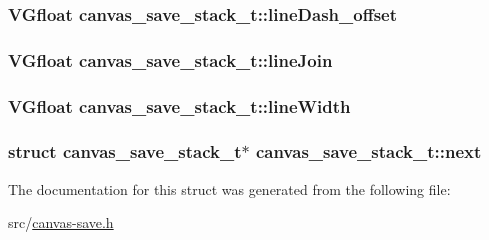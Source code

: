 \subsubsection[{line\+Dash\+\_\+offset}]{\setlength{\rightskip}{0pt plus 5cm}V\+Gfloat canvas\+\_\+save\+\_\+stack\+\_\+t\+::line\+Dash\+\_\+offset}\label{structcanvas__save__stack__t_a2a77bb2fd9162791d2913b8ebaaaf75b}
\hypertarget{structcanvas__save__stack__t_a5d8ef969283a63b2d7f8d2e42da4196b}{}
\subsubsection[{line\+Join}]{\setlength{\rightskip}{0pt plus 5cm}V\+Gfloat canvas\+\_\+save\+\_\+stack\+\_\+t\+::line\+Join}\label{structcanvas__save__stack__t_a5d8ef969283a63b2d7f8d2e42da4196b}
\hypertarget{structcanvas__save__stack__t_ae76623d478ccfaec28e3166c755ec174}{}
\subsubsection[{line\+Width}]{\setlength{\rightskip}{0pt plus 5cm}V\+Gfloat canvas\+\_\+save\+\_\+stack\+\_\+t\+::line\+Width}\label{structcanvas__save__stack__t_ae76623d478ccfaec28e3166c755ec174}
\hypertarget{structcanvas__save__stack__t_a214b86daeaa6f4461d169921a9c0298d}{}
\subsubsection[{next}]{\setlength{\rightskip}{0pt plus 5cm}struct {\bf canvas\+\_\+save\+\_\+stack\+\_\+t}$\ast$ canvas\+\_\+save\+\_\+stack\+\_\+t\+::next}\label{structcanvas__save__stack__t_a214b86daeaa6f4461d169921a9c0298d}


The documentation for this struct was generated from the following file\+:\begin{DoxyCompactItemize}
\item 
src/\hyperlink{canvas-save_8h}{canvas-\/save.\+h}\end{DoxyCompactItemize}
